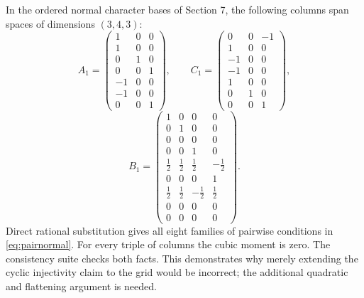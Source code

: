 \documentclass[11pt]{article}
\theoremstyle{definition}\newtheorem{definition}[theorem]{Definition}
\theoremstyle{remark}\newtheorem{remark}[theorem]{Remark}
\begin{document}
In the ordered normal character bases of Section 7, the following columns
span spaces of dimensions $(3,4,3)$:
\[
 A_1=\begin{pmatrix}
 1&0&0\\1&0&0\\0&1&0\\0&0&1\\-1&0&0\\-1&0&0\\0&0&1
 \end{pmatrix},\qquad
 C_1=\begin{pmatrix}
 0&0&-1\\1&0&0\\-1&0&0\\-1&0&0\\1&0&0\\0&1&0\\0&0&1
 \end{pmatrix},
\]
\[
 B_1=\begin{pmatrix}
 1&0&0&0\\0&1&0&0\\0&0&0&0\\0&0&1&0\\
 \frac12&\frac12&\frac12&-\frac12\\0&0&0&1\\
 \frac12&\frac12&-\frac12&\frac12\\0&0&0&0\\0&0&0&0
 \end{pmatrix}.
\]
Direct rational substitution gives all eight families of pairwise
conditions in \eqref{eq:pairnormal}. For every triple of columns the cubic
moment is zero. The consistency suite checks both facts. This demonstrates
why merely extending the cyclic injectivity claim to the grid would be
incorrect; the additional quadratic and flattening argument is needed.

\clearpage
\end{document}
